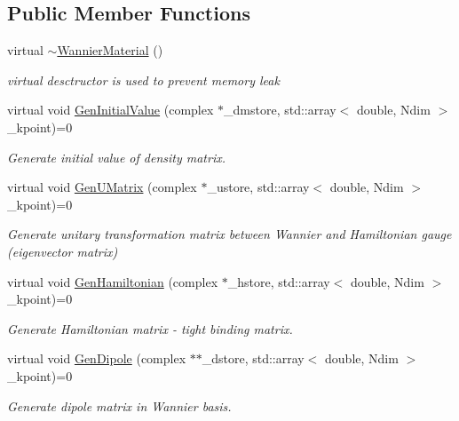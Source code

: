 \subsection*{Public Member Functions}
\begin{DoxyCompactItemize}
\item 
\mbox{\label{class_wannier_material_aec1a2077bb9c951142046b50b3cf8dc4}} 
virtual \hyperlink{class_wannier_material_aec1a2077bb9c951142046b50b3cf8dc4}{$\sim$\+Wannier\+Material} ()
\begin{DoxyCompactList}\small\item\em virtual desctructor is used to prevent memory leak \end{DoxyCompactList}\item 
virtual void \hyperlink{class_wannier_material_a04a8b16ca66443aa57f4fc95237ea24c}{Gen\+Initial\+Value} (complex $\ast$\+\_\+dmstore, std\+::array$<$ double, Ndim $>$ \+\_\+kpoint)=0
\begin{DoxyCompactList}\small\item\em Generate initial value of density matrix. \end{DoxyCompactList}\item 
virtual void \hyperlink{class_wannier_material_a883aa9e556d92fea6e4a5247554cc83c}{Gen\+U\+Matrix} (complex $\ast$\+\_\+ustore, std\+::array$<$ double, Ndim $>$ \+\_\+kpoint)=0
\begin{DoxyCompactList}\small\item\em Generate unitary transformation matrix between Wannier and Hamiltonian gauge (eigenvector matrix) \end{DoxyCompactList}\item 
virtual void \hyperlink{class_wannier_material_a449df8004573530c272fb8db16ff6bfe}{Gen\+Hamiltonian} (complex $\ast$\+\_\+hstore, std\+::array$<$ double, Ndim $>$ \+\_\+kpoint)=0
\begin{DoxyCompactList}\small\item\em Generate Hamiltonian matrix -\/ tight binding matrix. \end{DoxyCompactList}\item 
virtual void \hyperlink{class_wannier_material_a9a5087fbcae395f007d77968f9d00d46}{Gen\+Dipole} (complex $\ast$$\ast$\+\_\+dstore, std\+::array$<$ double, Ndim $>$ \+\_\+kpoint)=0
\begin{DoxyCompactList}\small\item\em Generate dipole matrix in Wannier basis. \end{DoxyCompactList}\item 
$$
\end{DoxyCompactItemize}
